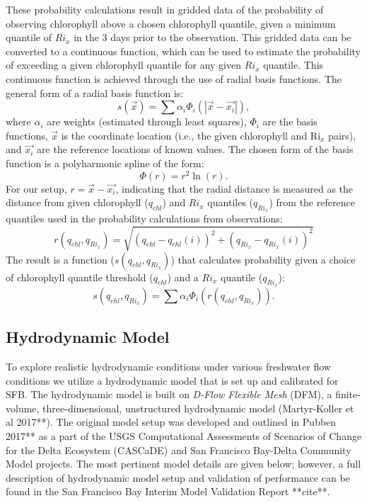 \documentclass[preprint,review,12pt]{elsarticle}
\begin{document}
These probability calculations result in gridded data of the probability of observing chlorophyll above a chosen chlorophyll quantile, given a minimum quantile of \(Ri_x\) in the 3 days prior to the observation. This gridded data can be converted to a continuous function, which can be used to estimate the probability of exceeding a given chlorophyll quantile for any given \(Ri_x\) quantile. This continuous function is achieved through the use of radial basis functions. The general form of a radial basis function is: 
\begin{equation}\label{eq:rbf}
    s(\vec{x}) = \sum \alpha_i \Phi_i ( |\vec{x} - \vec{x_i}|),
\end{equation}
where \(\alpha_i\) are weights (estimated through least squares), \(\Phi_i\) are the basis functions, \(\vec{x}\) is the coordinate location (i.e., the given chlorophyll and Ri\(_x\) pairs), and \(\vec{x_i}\) are the reference locations of known values. 
The chosen form of the basis function is a polyharmonic spline of the form:
\begin{equation}\label{Phi}
    \Phi (r) = r^2 \ln(r).
\end{equation}
For our setup, \(r = \vec{x} - \vec{x_i}\), indicating that the radial distance is measured as the distance from given chlorophyll (\(q_{chl}\)) and \(Ri_x\) quantiles (\(q_{Ri_x}\)) from the reference quantiles used in the probability calculations from observations:
\begin{equation}\label{eq:distance}
    r(q_{chl}, q_{Ri_x}) = \sqrt{(q_{chl}-q_{chl}(i))^2 + (q_{Ri_x}-q_{Ri_x}(i))^2}
\end{equation}
The result is a function (\(s(q_{chl}, q_{Ri_x})\)) that calculates probability given a choice of chlorophyll quantile threshold (\(q_{chl}\)) and a \(Ri_x\) quantile (\(q_{Ri_x}\)):
\begin{equation}\label{eq:full_rbf}
    s(q_{chl}, q_{Ri_x}) = \sum \alpha_i \Phi_i ( r(q_{chl}, q_{Ri_x})).
\end{equation}

\subsection{Hydrodynamic Model}\label{S:model}
To explore realistic hydrodynamic conditions under various freshwater flow conditions we utilize a hydrodynamic model that is set up and calibrated for SFB. The hydrodynamic model is built on {\em D-Flow Flexible Mesh} (DFM), a finite-volume, three-dimensional, unstructured hydrodynamic model (Martyr-Koller et al 2017**). The original model setup was developed and outlined in Pubben 2017** as a part of the USGS Computational Assessments of Scenarios of Change for the Delta Ecosystem (CASCaDE) and San Francisco Bay-Delta Community Model projects. The most pertinent model details are given below; however, a full description of hydrodynamic model setup and validation of performance can be found in the San Francisco Bay Interim Model Validation Report **cite**. 
\end{document}
